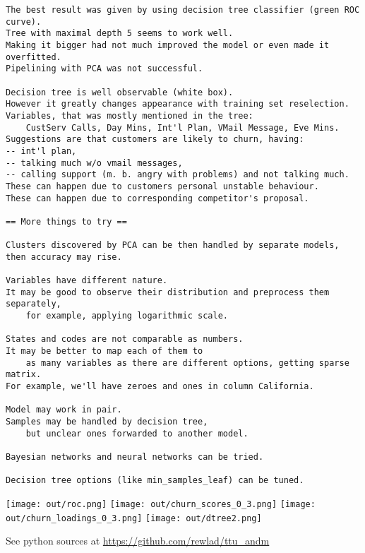 \documentclass{article}
\begin{document}
\begin{verbatim}
The best result was given by using decision tree classifier (green ROC curve).
Tree with maximal depth 5 seems to work well.
Making it bigger had not much improved the model or even made it overfitted.
Pipelining with PCA was not successful.

Decision tree is well observable (white box).
However it greatly changes appearance with training set reselection.
Variables, that was mostly mentioned in the tree:
    CustServ Calls, Day Mins, Int'l Plan, VMail Message, Eve Mins.
Suggestions are that customers are likely to churn, having:
-- int'l plan,
-- talking much w/o vmail messages,
-- calling support (m. b. angry with problems) and not talking much.
These can happen due to customers personal unstable behaviour.
These can happen due to corresponding competitor's proposal.

== More things to try ==

Clusters discovered by PCA can be then handled by separate models, 
then accuracy may rise.

Variables have different nature. 
It may be good to observe their distribution and preprocess them separately,
    for example, applying logarithmic scale.

States and codes are not comparable as numbers.
It may be better to map each of them to 
    as many variables as there are different options, getting sparse matrix.
For example, we'll have zeroes and ones in column California. 

Model may work in pair.
Samples may be handled by decision tree, 
    but unclear ones forwarded to another model.

Bayesian networks and neural networks can be tried.

Decision tree options (like min_samples_leaf) can be tuned.

\end{verbatim}

\clearpage

\centering
\texttt{[image: out/roc.png]}
\texttt{[image: out/churn\_scores\_0\_3.png]}
\texttt{[image: out/churn\_loadings\_0\_3.png]}
\clearpage
\texttt{[image: out/dtree2.png]}


\clearpage

See python sources at \url{https://github.com/rewlad/ttu_andm}


\end{document}
